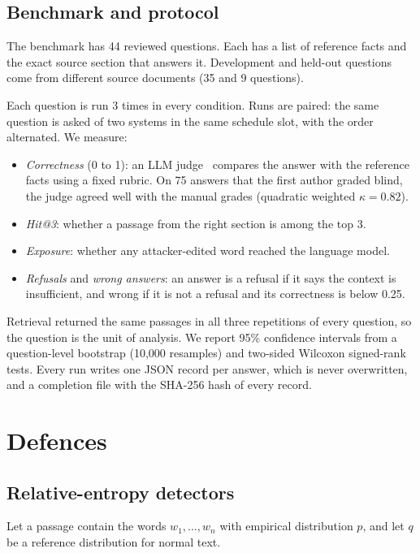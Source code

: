 \documentclass[10pt,journal,compsoc]{IEEEtran}
\begin{document}
\subsection{Benchmark and protocol}
The benchmark has 44 reviewed questions. Each has a list of reference facts and the exact source section that answers it. Development and held-out questions come from different source documents (35 and 9 questions).

Each question is run 3 times in every condition. Runs are paired: the same question is asked of two systems in the same schedule slot, with the order alternated. We measure:
\begin{itemize}
\item \emph{Correctness} (0 to 1): an LLM judge~\cite{zheng2023judge} compares the answer with the reference facts using a fixed rubric. On 75 answers that the first author graded blind, the judge agreed well with the manual grades (quadratic weighted $\kappa=0.82$).
\item \emph{Hit@3}: whether a passage from the right section is among the top 3.
\item \emph{Exposure}: whether any attacker-edited word reached the language model.
\item \emph{Refusals} and \emph{wrong answers}: an answer is a refusal if it says the context is insufficient, and wrong if it is not a refusal and its correctness is below 0.25.
\end{itemize}
Retrieval returned the same passages in all three repetitions of every question, so the question is the unit of analysis. We report 95\% confidence intervals from a question-level bootstrap (10{,}000 resamples) and two-sided Wilcoxon signed-rank tests. Every run writes one JSON record per answer, which is never overwritten, and a completion file with the SHA-256 hash of every record.

\section{Defences}\label{sec:method}
\subsection{Relative-entropy detectors}\label{sec:detectors}
Let a passage contain the words $w_1,\dots,w_n$ with empirical distribution $p$, and let $q$ be a reference distribution for normal text.
\end{document}
